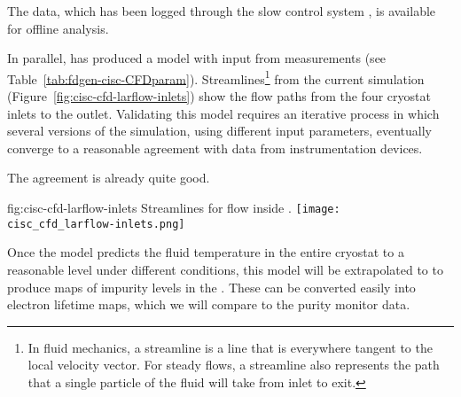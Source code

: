 The data, which has been logged through the  slow control system \cite{pdspdcs_proc}, is available for offline analysis. 


In parallel,  has produced a   model %
with input from  measurements (see Table~\ref{tab:fdgen-cisc-CFDparam}). Streamlines\footnote{In fluid mechanics, a streamline is a line that is everywhere tangent to the local velocity vector. For steady flows, a streamline also represents the path that a single particle of the fluid will take from inlet to exit.} from the current  simulation (Figure~\ref{fig:cisc-cfd-larflow-inlets}) show the flow paths from the four cryostat inlets to the outlet. Validating this model requires an iterative process in which several versions of the  simulation, using different input parameters, eventually %
converge %
to a reasonable agreement with data from instrumentation devices. 



The agreement is already quite good. %
\begin{dunefigure}{fig:cisc-cfd-larflow-inlets}
  {Streamlines for  flow inside  .}
  \texttt{[image: cisc\_cfd\_larflow-inlets.png]}
\end{dunefigure}



Once the   model %
predicts the fluid temperature in the entire cryostat to a reasonable level under different conditions, this model will be extrapolated to    
to produce maps of impurity levels in the . These can be converted easily into electron lifetime maps, which we will %
compare to the %
 purity monitor data. 


